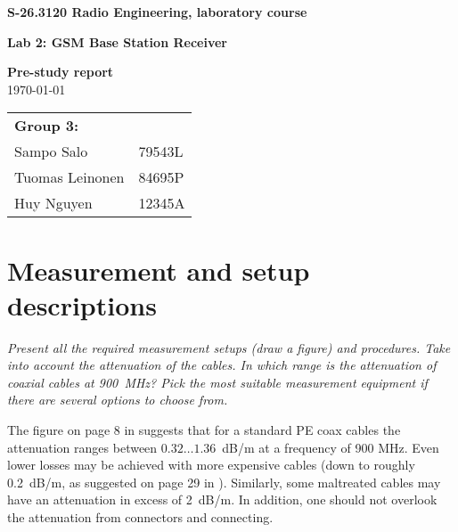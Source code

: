 \documentclass[a4paper, 12pt]{article}
\newlength{\oneLine}
\begin{document}
\begin{titlepage}
\pagestyle{empty}
\begin{center}

\vspace*{30mm}
\noindent\LARGE{\textbf{S-26.3120 Radio Engineering, laboratory course}}

\vspace*{20mm}

\Large{\textbf{Lab 2: GSM Base Station Receiver}}\\

\vspace*{15mm}

\large{\textbf{Pre-study report}}\\
\vspace{15mm}
\large{\today}
	
\vspace*{30mm}
\large{
	\begin{tabular}{l l}
		\textbf{Group 3:} 	& \\
		Sampo Salo			& 79543L	\\
		Tuomas Leinonen 	& 84695P	\\
		Huy Nguyen			& 12345A			
	\end{tabular}
}

\end{center}

\end{titlepage}

\section{Measurement and setup descriptions}

\textit{Present all the required measurement setups (draw a figure) 
and procedures. Take into account the attenuation of the cables. In 
which range is the attenuation of coaxial cables at 900~MHz? Pick 
the most suitable measurement equipment if there are several options 
to choose from.}

\vspace*{\oneLine}
\noindent
The figure on page 8 in \cite{hs} suggests that for a standard PE coax 
cables the attenuation ranges between $0.32 \ldots 1.36$~dB/m at a frequency 
of 900 MHz. Even lower losses may be achieved with more expensive cables 
(down to roughly 0.2~dB/m, as suggested on page 29 in \cite{hs}). Similarly, 
some maltreated cables may have an attenuation in excess of 2~dB/m. In 
addition, one should not overlook the attenuation from connectors and 
connecting.
\end{document}
